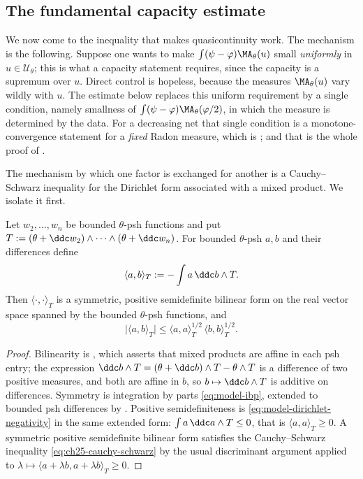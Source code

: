 \subsection{The fundamental capacity estimate}
\label{sec:ch25-fundamental}

We now come to the inequality that makes quasicontinuity work.  The
mechanism is the following.  Suppose one wants to make
\(\int(\psi-\varphi)\MA_\theta(u)\) small \emph{uniformly} in
\(u\in\mathcal U_\theta\); this is what a capacity statement requires, since
the capacity is a supremum over \(u\).  Direct control is hopeless, because
the measures \(\MA_\theta(u)\) vary wildly with \(u\).  The estimate below
replaces this uniform requirement by a single condition, namely smallness of
\(\int(\psi-\varphi)\MA_\theta(\varphi/2)\), in which the measure is
determined by the data.  For a decreasing net that single condition is a
monotone-convergence statement for a \emph{fixed} Radon measure, which is
; and that is the whole proof of
.

The mechanism by which one factor is exchanged for another is a
Cauchy--Schwarz inequality for the Dirichlet form associated with a mixed
product.  We isolate it first.

\begin{lemma}
\label{lem:ch25-dirichlet-form}
Let \(w_2,\ldots,w_n\) be bounded \(\theta\)-psh functions and put
\(T:=(\theta+\ddc w_2)\wedge\cdots\wedge(\theta+\ddc w_n)\).  For bounded
\(\theta\)-psh \(a,b\) and their differences define
\[
 \langle a,b\rangle_T:=-\int a\,\ddc b\wedge T .
\]
Then \(\langle\cdot,\cdot\rangle_T\) is a symmetric, positive semidefinite
bilinear form on the real vector space spanned by the bounded
\(\theta\)-psh functions, and
\begin{equation}
\label{eq:ch25-cauchy-schwarz}
 \bigl|\langle a,b\rangle_T\bigr|
 \leq\langle a,a\rangle_T^{1/2}\,\langle b,b\rangle_T^{1/2}.
\end{equation}
\end{lemma}

\begin{proof}
Bilinearity is , which asserts that mixed
products are affine in each psh entry; the expression
\(\ddc b\wedge T=(\theta+\ddc b)\wedge T-\theta\wedge T\) is a difference of
two positive measures, and both are affine in \(b\), so
\(b\mapsto\ddc b\wedge T\) is additive on differences.  Symmetry is
integration by parts \eqref{eq:model-ibp}, extended to bounded psh
differences by .  Positive
semidefiniteness is \eqref{eq:model-dirichlet-negativity} in the same
extended form: \(\int a\,\ddc a\wedge T\leq0\), that is
\(\langle a,a\rangle_T\geq0\).  A symmetric positive semidefinite bilinear
form satisfies the Cauchy--Schwarz inequality
\eqref{eq:ch25-cauchy-schwarz} by the usual discriminant argument applied to
\(\lambda\mapsto\langle a+\lambda b,a+\lambda b\rangle_T\geq0\).
\end{proof}


